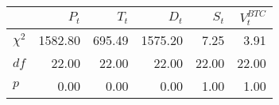 \begin{tabular}{lrrrrr}
  \toprule
 & $P_{t}$ & $T_{t}$ & $D_{t}$ & $S_{t}$ & $V^{BTC}_{t}$ \\ 
  \midrule
${\chi}^2$ & 1582.80 & 695.49 & 1575.20 & 7.25 & 3.91 \\ 
  $df$ & 22.00 & 22.00 & 22.00 & 22.00 & 22.00 \\ 
  $p$ & 0.00 & 0.00 & 0.00 & 1.00 & 1.00 \\ 
   \bottomrule
\end{tabular}
